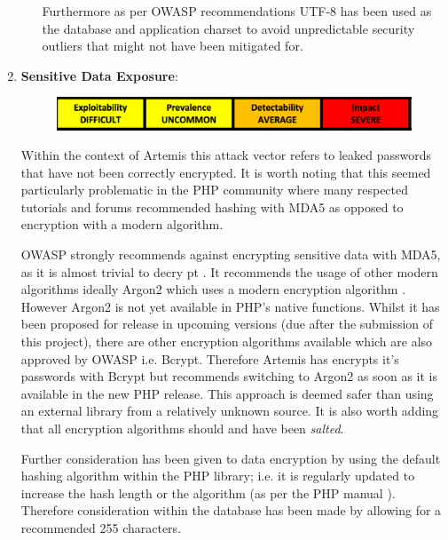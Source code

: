 \begin{enumerate}
\begin{itemize}
        Furthermore as per OWASP recommendations UTF-8 has been used as the database and application charset to avoid unpredictable security outliers \cite{OWASPa,OWASPb} that might not have been mitigated for.
        

    \end{itemize}
    
    
    
    
    
    
    \item \textbf{Sensitive Data Exposure}:

    \begin{figure}[h]
    	\centering
    	\includegraphics[scale=0.5,center]{chapters/chapter03/figures/sensitive.png}
    	\label{Sensitive Data Exposure}
    \end{figure}
    
    Within the context of Artemis this attack vector refers to leaked passwords that have not been correctly encrypted. It is worth noting that this seemed particularly problematic in the PHP community where many respected tutorials and forums recommended hashing with MDA5  as opposed to encryption with a modern algorithm.
    
    OWASP strongly recommends against encrypting sensitive data with MDA5, as it is almost trivial to decry pt \cite{OWASPc}. It recommends the usage of other modern algorithms ideally Argon2 which uses a modern encryption algorithm \cite{OWASPc}. However Argon2 is not yet available in PHP's native functions. Whilst it has been proposed for release in upcoming versions (due after the submission of this project), there are other encryption algorithms available which are also approved by OWASP i.e. Bcrypt. Therefore Artemis has encrypts it's passwords with Bcrypt but recommends switching to Argon2 as soon as it is available in the new PHP release. This approach is deemed safer than using an external library from a relatively unknown source. It is also worth adding that all encryption algorithms should and have been \textit{salted}.
    
    Further consideration has been given to data encryption by using the default hashing algorithm within the PHP library; i.e. it is regularly updated to increase the hash length or the algorithm (as per the PHP manual \cite{PHPc}). Therefore consideration within the database has been made by allowing for a recommended 255 characters.
    

\end{enumerate}
